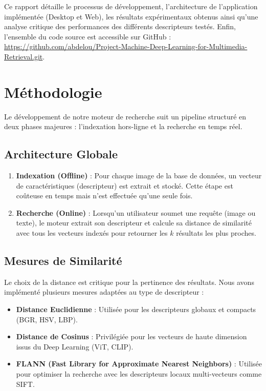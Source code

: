 \documentclass[a4paper,12pt]{report}%
\begin{document}
Ce rapport détaille le processus de développement, l’architecture de l’application implémentée (Desktop et Web), les résultats expérimentaux obtenus ainsi qu’une analyse critique des performances des différents descripteurs testés. Enfin, l'ensemble du code source est accessible sur GitHub : \url{https://github.com/abdelou/Project-Machine-Deep-Learning-for-Multimedia-Retrieval.git}.

\chapter{Méthodologie}
Le développement de notre moteur de recherche suit un pipeline structuré en deux phases majeures : l'indexation hors-ligne et la recherche en temps réel.

\section{Architecture Globale}
\begin{enumerate}
    \item \textbf{Indexation (Offline)} : Pour chaque image de la base de données, un vecteur de caractéristiques (descripteur) est extrait et stocké. Cette étape est coûteuse en temps mais n'est effectuée qu'une seule fois.
    \item \textbf{Recherche (Online)} : Lorsqu'un utilisateur soumet une requête (image ou texte), le moteur extrait son descripteur et calcule sa distance de similarité avec tous les vecteurs indexés pour retourner les $k$ résultats les plus proches.
\end{enumerate}

\section{Mesures de Similarité}
Le choix de la distance est critique pour la pertinence des résultats. Nous avons implémenté plusieurs mesures adaptées au type de descripteur :
\begin{itemize}
    \item \textbf{Distance Euclidienne} : Utilisée pour les descripteurs globaux et compacts (BGR, HSV, LBP).
    \item \textbf{Distance de Cosinus} : Privilégiée pour les vecteurs de haute dimension issus du Deep Learning (ViT, CLIP).
    \item \textbf{FLANN (Fast Library for Approximate Nearest Neighbors)} : Utilisée pour optimiser la recherche avec les descripteurs locaux multi-vecteurs comme SIFT.
\end{itemize}
\end{document}
